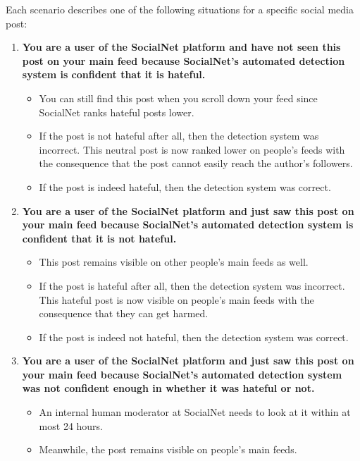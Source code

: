 \begin{flushleft}
    Each scenario describes one of the following situations for a specific social media post:
\end{flushleft}

\begin{enumerate}
    \item \textbf{You are a user of the SocialNet platform and have \textbf{not} seen this post on your main feed because SocialNet's automated detection system is confident that it is hateful.}
          \begin{itemize}
              \item You can still find this post when you scroll down your feed since SocialNet ranks hateful posts lower.
              \item If the post is not hateful after all, then the detection system was incorrect. This neutral post is now ranked lower on people's feeds with the consequence that the post cannot easily reach the author's followers.
              \item If the post is indeed hateful, then the detection system was correct.
          \end{itemize}
    \item \textbf{You are a user of the SocialNet platform and just saw this post on your main feed because SocialNet's automated detection system is confident that it is \textbf{not hateful}.}
          \begin{itemize}
              \item This post remains visible on other people's main feeds as well.
              \item If the post is hateful after all, then the detection system was incorrect. This hateful post is now visible on people's main feeds with the consequence that they can get harmed.
              \item If the post is indeed not hateful, then the detection system was correct.
          \end{itemize}
    \item \textbf{You are a user of the SocialNet platform and just saw this post on your main feed because SocialNet's automated detection system was not confident enough in whether it was hateful or not.}
          \begin{itemize}
              \item An internal human moderator at SocialNet needs to look at it within at most 24 hours.
              \item Meanwhile, the post remains visible on people's main feeds.
          \end{itemize}
\end{enumerate}

